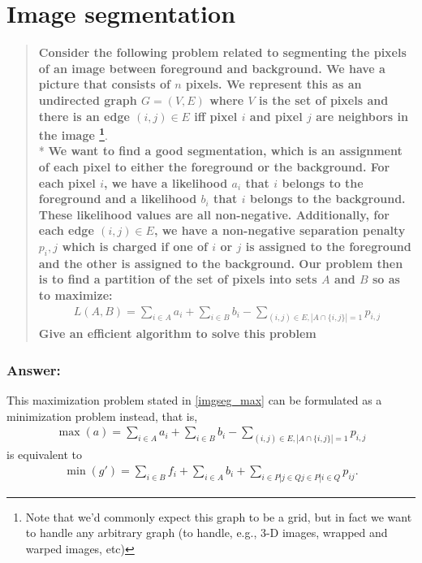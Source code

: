 \documentclass[titlepage]{article}\usepackage[]{graphicx}\usepackage[]{color}
\begin{document}
  



\section{Image segmentation}
  \begin{quote}
    \textbf{Consider the following problem related to segmenting the pixels
      of an image between foreground and background. We have a picture that
      consists of $n$ pixels. We represent this as an undirected graph $G =
      (V,E)$ where $V$ is the set of pixels and there is an edge $(i,j) \in
      E$ iff pixel $i$ and pixel $j$ are neighbors in the image
      \footnote{Note that we'd commonly expect this graph to be a grid, but
        in fact we want to handle any arbitrary graph (to handle, e.g., 3-D
        images, wrapped and warped images, etc)}}. \\* 
        \textbf{We want to find
        a good segmentation, which is an assignment of each pixel to either
        the foreground or the background.  For each pixel $i$, we have a
        likelihood $a_i$ that $i$ belongs to the foreground and a likelihood
        $b_i$ that $i$ belongs to the background. These likelihood values are
        all non-negative. Additionally, for each edge $(i, j) \in E$, we have
        a non-negative separation penalty $p_i,j$ which is charged if one of
        $i$ or $j$ is assigned to the foreground and the other is assigned to
        the background.  Our problem then is to find a partition of the set
        of pixels into sets $A$ and $B$ so as to maximize:}
        \begin{align}
        \label{imgseg_max}
        L(A, B) = \sum_{i \in A}  a_i + \sum_{i \in B} b_i − \sum_{(i,j) \in E,
          | A \cap \{i,j\} | = 1} p_{i,j} 
        \end{align}
      \textbf{Give an efficient algorithm to solve this problem}
  \end{quote}

  \subsubsection{Answer:}

  This maximization problem stated in \ref{imgseg_max} can be formulated as a
  minimization problem instead, that is,
  \begin{align}
    \label{imgseq_min}
    \max(a) = \sum_{i \in A}  a_i + \sum_{i \in B} b_i − \sum_{(i,j) \in E, | A \cap \{i,j\} | = 1} p_{i,j} 
  \end{align}
is equivalent to
  \begin{align}
    \label{blah}
    \min (g') = \sum_{i \in B} f_i + \sum_{i \in A} b_i + \sum_{i \in P| j \in Q j \in P|i \in Q } p_{ij}. 
  \end{align}
\end{document}
